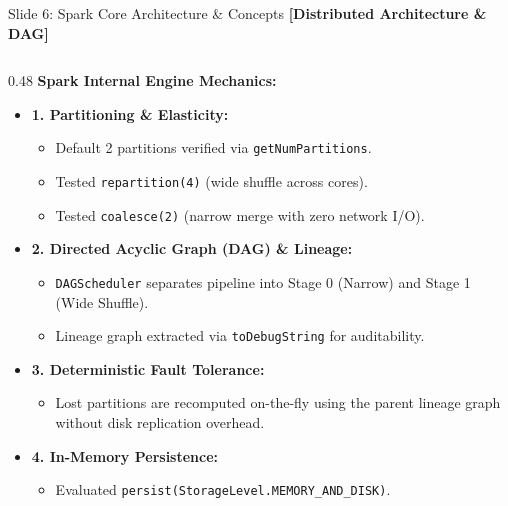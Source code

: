 \documentclass[aspectratio=169]{beamer}
\begin{document}
\begin{frame}{Slide 6: Spark Core Architecture \& Concepts \hfill \footnotesize\color{AmritaMaroon}\textbf{[Distributed Architecture \& DAG]}}
    \begin{columns}[T]
        \begin{column}{0.48\textwidth}
            \textbf{\textcolor{NavyBlue}{Spark Internal Engine Mechanics:}}
            \begin{itemize}\tiny
                \setlength{\itemsep}{2pt}
                \item \textbf{1. Partitioning \& Elasticity:}
                  \begin{itemize}\tiny
                    \item Default 2 partitions verified via \texttt{getNumPartitions}.
                    \item Tested \texttt{repartition(4)} (wide shuffle across cores).
                    \item Tested \texttt{coalesce(2)} (narrow merge with zero network I/O).
                  \end{itemize}
                \item \textbf{2. Directed Acyclic Graph (DAG) \& Lineage:}
                  \begin{itemize}\tiny
                    \item \texttt{DAGScheduler} separates pipeline into Stage 0 (Narrow) and Stage 1 (Wide Shuffle).
                    \item Lineage graph extracted via \texttt{toDebugString} for auditability.
                  \end{itemize}
                \item \textbf{3. Deterministic Fault Tolerance:}
                  \begin{itemize}\tiny
                    \item Lost partitions are recomputed on-the-fly using the parent lineage graph without disk replication overhead.
                  \end{itemize}
                \item \textbf{4. In-Memory Persistence:}
                  \begin{itemize}\tiny
                    \item Evaluated \texttt{persist(StorageLevel.MEMORY\_AND\_DISK)}.

\end{itemize}
\end{itemize}
\end{column}
\end{columns}
\end{frame}
\end{document}
